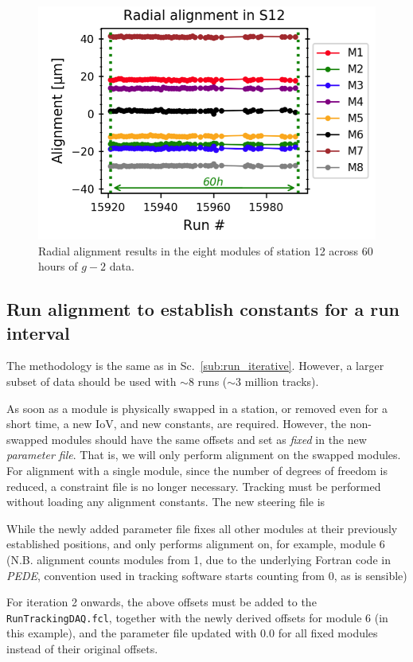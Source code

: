 \documentclass[12pt]{article}
\begin{document}
    \begin{figure}[tbp]
    \centering
    \includegraphics[width = 0.6\linewidth]{fig/60h.png}
    \caption{Radial alignment results in the eight modules of station 12 across 60 hours of $g-2$ data.}
    \label{fig:60h}
    \end{figure}

\subsection{Run alignment to establish constants for a run interval}
The methodology is the same as in Sc.~\ref{sub:run_iterative}. However, a larger subset of data should be used with $\sim8$ runs ($\sim$3 million tracks). 

As soon as a module is physically swapped in a station, or removed even for a short time, a new IoV, and new constants, are required. However, the non-swapped modules should have the same offsets and set as \textit{fixed} in the new \textit{parameter file}. That is, we will only perform alignment on the swapped modules. For alignment with a single module, since the number of degrees of freedom is reduced, a constraint file is no longer necessary. Tracking must be performed without loading any alignment constants.
The new steering file is

\clearpage
While the newly added parameter file fixes all other modules at their previously established positions, and only performs alignment on, for example, module 6 (N.B. alignment counts modules from 1, due to the underlying Fortran code in \textit{PEDE}, convention used in tracking software starts counting from 0, as is sensible)

For iteration 2 onwards, the above offsets must be added to the \verb!RunTrackingDAQ.fcl!, together with the newly derived offsets for module 6 (in this example), and the parameter file updated with $0.0$ for all fixed modules instead of their original offsets.
\end{document}
